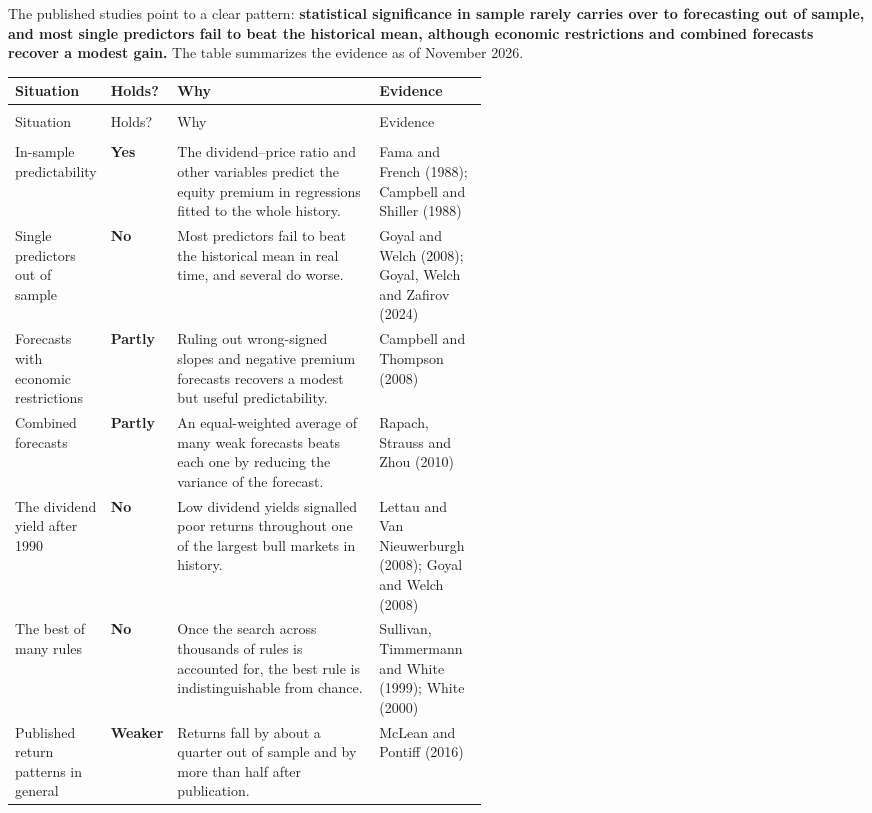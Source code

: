 The published studies point to a clear pattern: \textbf{statistical significance in sample rarely carries over to forecasting out of sample, and most single predictors fail to beat the historical mean, although economic restrictions and combined forecasts recover a modest gain.} The table summarizes the evidence as of November 2026.

\begingroup
\small
\setlength{\LTpre}{6pt}\setlength{\LTpost}{6pt}
\begin{longtable}{@{}>{\raggedright\arraybackslash}p{0.19\linewidth}>{\raggedright\arraybackslash}p{0.13\linewidth}>{\raggedright\arraybackslash}p{}>{\raggedright\arraybackslash}p{0.23\linewidth}@{}}
\toprule
Situation & Holds? & Why & Evidence \\
\midrule
\endfirsthead
\multicolumn{4}{@{}l}{\emph{(continued)}} \\
\toprule
Situation & Holds? & Why & Evidence \\
\midrule
\endhead
\midrule
\multicolumn{4}{r@{}}{\emph{(continued on the next page)}} \\
\endfoot
\bottomrule
\endlastfoot
In-sample predictability & \textbf{Yes} & The dividend--price ratio and other variables predict the equity premium in regressions fitted to the whole history. & Fama and French (1988); Campbell and Shiller (1988) \\*
\addlinespace[3pt]
Single predictors out of sample & \textbf{No} & Most predictors fail to beat the historical mean in real time, and several do worse. & Goyal and Welch (2008); Goyal, Welch and Zafirov (2024) \\
\addlinespace[3pt]
Forecasts with economic restrictions & \textbf{Partly} & Ruling out wrong-signed slopes and negative premium forecasts recovers a modest but useful predictability. & Campbell and Thompson (2008) \\
\addlinespace[3pt]
Combined forecasts & \textbf{Partly} & An equal-weighted average of many weak forecasts beats each one by reducing the variance of the forecast. & Rapach, Strauss and Zhou (2010) \\
\addlinespace[3pt]
The dividend yield after 1990 & \textbf{No} & Low dividend yields signalled poor returns throughout one of the largest bull markets in history. & Lettau and Van Nieuwerburgh (2008); Goyal and Welch (2008) \\
\addlinespace[3pt]
The best of many rules & \textbf{No} & Once the search across thousands of rules is accounted for, the best rule is indistinguishable from chance. & Sullivan, Timmermann and White (1999); White (2000) \\*
\addlinespace[3pt]
Published return patterns in general & \textbf{Weaker} & Returns fall by about a quarter out of sample and by more than half after publication. & McLean and Pontiff (2016) \\
\end{longtable}
\addtocounter{table}{-1}%
\endgroup

